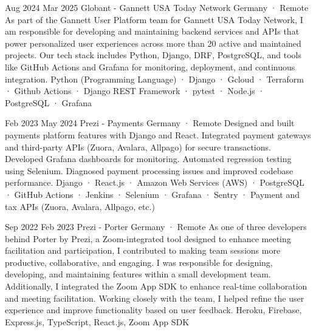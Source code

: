 \documentclass[a4paper,nocolors]{cv-friggeri-x}
\begin{document}
\begin{entrylist}


\entryexperience
{Aug 2024}
{Mar 2025}
{Globant - Gannett USA Today Network }
{Germany · Remote}
{As part of the Gannett User Platform team for Gannett USA Today Network, I am responsible for developing and maintaining backend services and APIs that power personalized user experiences across more than 20 active and maintained projects. Our tech stack includes Python, Django, DRF, PostgreSQL, and tools like GitHub Actions and Grafana for monitoring, deployment, and continuous integration.}
{Python (Programming Language) · Django · Gcloud · Terraform · Github Actions · Django REST Framework · pytest · Node.js · PostgreSQL · Grafana}


\entryexperience
{Feb 2023}
{May 2024}
{Prezi - Payments }
{Germany · Remote}
{Designed and built payments platform features with Django and React. Integrated payment gateways and third-party APIs (Zuora, Avalara, Allpago) for secure transactions. Developed Grafana dashboards for monitoring. Automated regression testing using Selenium. Diagnosed payment processing issues and improved codebase performance.}
{Django · React.js · Amazon Web Services (AWS) · PostgreSQL · GitHub Actions · Jenkins · Selenium · Grafana · Sentry · Payment and tax APIs (Zuora, Avalara, Allpago, etc.)}

\entryexperience
{Sep 2022}
{Feb 2023}
{Prezi - Porter}
{Germany · Remote}
{As one of three developers behind Porter by Prezi, a Zoom-integrated tool designed to enhance meeting facilitation and participation, I contributed to making team sessions more productive, collaborative, and engaging. I was responsible for designing, developing, and maintaining features within a small development team. Additionally, I integrated the Zoom App SDK to enhance real-time collaboration and meeting facilitation. Working closely with the team, I helped refine the user experience and improve functionality based on user feedback.}
{Heroku, Firebase, Express.js, TypeScript, React.js, Zoom App SDK}


\end{entrylist}
\end{document}
